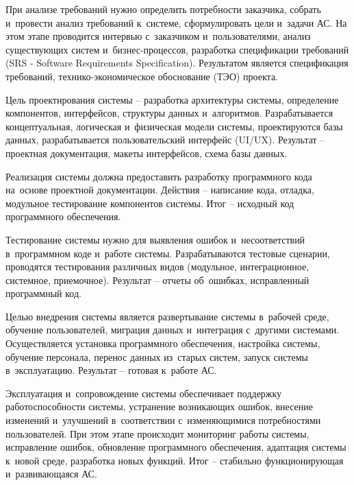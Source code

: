 \documentclass{ou}
\begin{document}
При анализе требований нужно определить потребности заказчика, собрать и~провести анализ требований к~системе, сформулировать цели и~задачи АС. На этом этапе проводится интервью с~заказчиком и~пользователями, анализ существующих систем и~бизнес-процессов, разработка спецификации требований (SRS - Software Requirements Specification). Результатом является спецификация требований, технико-экономическое обоснование (ТЭО) проекта.

Цель проектирования системы -- разработка архитектуры системы, определение компонентов, интерфейсов, структуры данных и~алгоритмов. Разрабатывается концептуальная, логическая и~физическая модели системы, проектируются базы данных, разрабатывается пользовательский интерфейс (UI/UX). Результат -- проектная документация, макеты интерфейсов, схема базы данных.

Реализация системы должна предоставить разработку программного кода на~основе проектной документации. Действия -- написание кода, отладка, модульное тестирование компонентов системы. Итог -- исходный код программного обеспечения.

Тестирование системы нужно для выявления ошибок и~несоответствий в~программном коде и~работе системы. Разрабатываются тестовые сценарии, проводятся тестирования различных видов (модульное, интеграционное, системное, приемочное). Результат -- отчеты об~ошибках, исправленный программный код.

Целью внедрения системы является развертывание системы в~рабочей среде, обучение пользователей, миграция данных и~интеграция с~другими системами. Осуществляется установка программного обеспечения, настройка системы, обучение персонала, перенос данных из~старых систем, запуск системы в~эксплуатацию. Результат -- готовая к~работе АС.

Эксплуатация и~сопровождение системы обеспечивает поддержку работоспособности системы, устранение возникающих ошибок, внесение изменений и~улучшений в~соответствии с~изменяющимися потребностями пользователей. При этом этапе происходит мониторинг работы системы, исправление ошибок, обновление программного обеспечения, адаптация системы к~новой среде, разработка новых функций. Итог -- стабильно функционирующая и~развивающаяся АС.
\end{document}
